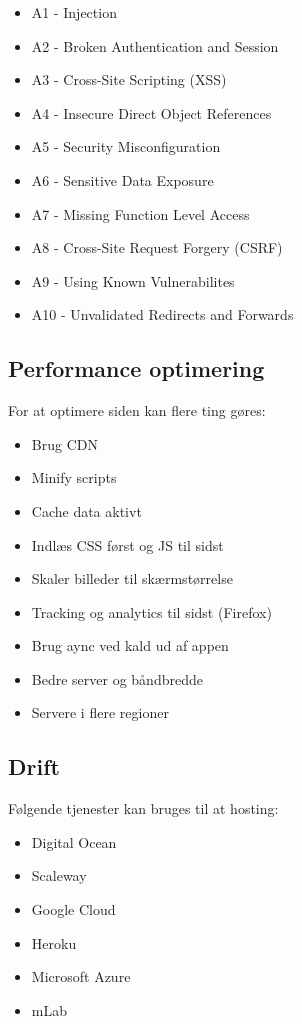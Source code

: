 \begin{multicols}{2}
	\begin{itemize}
		\item A1 - Injection
		\item A2 - Broken Authentication and Session
		\item A3 - Cross-Site Scripting (XSS)
		\item A4 - Insecure Direct Object References
		\item A5 - Security Misconfiguration
		\item A6 - Sensitive Data Exposure
		\item A7 - Missing Function Level Access
		\item A8 - Cross-Site Request Forgery (CSRF)
		\item A9 - Using Known Vulnerabilites
		\item A10 - Unvalidated Redirects and Forwards
	\end{itemize}
\end{multicols}

\subsection{Performance optimering}
For at optimere siden kan flere ting gøres: 

\begin{multicols}{2}
\begin{itemize}
	\item Brug CDN
	\item Minify scripts
	\item Cache data aktivt
	\item Indlæs CSS først og JS til sidst
	\item Skaler billeder til skærmstørrelse
	\item Tracking og analytics til sidst (Firefox)
	\item Brug aync ved kald ud af appen
	\item Bedre server og båndbredde
	\item Servere i flere regioner
\end{itemize}
\end{multicols}

\subsection{Drift}
Følgende tjenester kan bruges til at hosting: 

\begin{multicols}{2}
	\begin{itemize}
		\item Digital Ocean
		\item Scaleway
		\item Google Cloud
		\item Heroku
		\item Microsoft Azure
		\item mLab
	\end{itemize}
\end{multicols}

